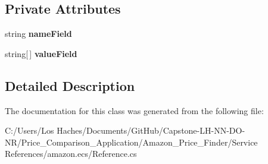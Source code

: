 \subsection*{Private Attributes}
\begin{DoxyCompactItemize}
\item 
\hypertarget{class_price___comparison_1_1amazon_1_1ecs_1_1_variation_attribute_a1b78dc11dbada2044868ccea93c3dbd0}{string {\bfseries name\-Field}}\label{class_price___comparison_1_1amazon_1_1ecs_1_1_variation_attribute_a1b78dc11dbada2044868ccea93c3dbd0}

\item 
\hypertarget{class_price___comparison_1_1amazon_1_1ecs_1_1_variation_attribute_adcca668e5780eafc0fc3835087dc7d88}{string\mbox{[}$\,$\mbox{]} {\bfseries value\-Field}}\label{class_price___comparison_1_1amazon_1_1ecs_1_1_variation_attribute_adcca668e5780eafc0fc3835087dc7d88}

\end{DoxyCompactItemize}


\subsection{Detailed Description}


The documentation for this class was generated from the following file\-:\begin{DoxyCompactItemize}
\item 
C\-:/\-Users/\-Los Haches/\-Documents/\-Git\-Hub/\-Capstone-\/\-L\-H-\/\-N\-N-\/\-D\-O-\/\-N\-R/\-Price\-\_\-\-Comparison\-\_\-\-Application/\-Amazon\-\_\-\-Price\-\_\-\-Finder/\-Service References/amazon.\-ecs/Reference.\-cs\end{DoxyCompactItemize}
